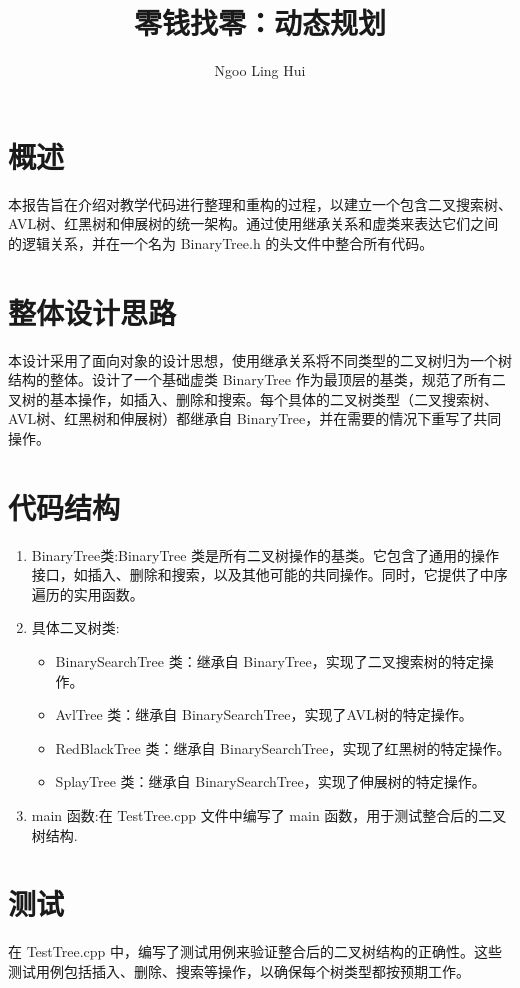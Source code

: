 \documentclass{ctexart}
\title{零钱找零：动态规划}
\author{Ngoo Ling Hui}
\begin{document}
\maketitle

\section{概述}
本报告旨在介绍对教学代码进行整理和重构的过程，以建立一个包含二叉搜索树、AVL树、红黑树和伸展树的统一架构。通过使用继承关系和虚类来表达它们之间的逻辑关系，并在一个名为 BinaryTree.h 的头文件中整合所有代码。

\section{整体设计思路}
本设计采用了面向对象的设计思想，使用继承关系将不同类型的二叉树归为一个树结构的整体。设计了一个基础虚类 BinaryTree 作为最顶层的基类，规范了所有二叉树的基本操作，如插入、删除和搜索。每个具体的二叉树类型（二叉搜索树、AVL树、红黑树和伸展树）都继承自 BinaryTree，并在需要的情况下重写了共同操作。

\section{代码结构}
\begin{enumerate}
    \item BinaryTree类:BinaryTree 类是所有二叉树操作的基类。它包含了通用的操作接口，如插入、删除和搜索，以及其他可能的共同操作。同时，它提供了中序遍历的实用函数。
    \item 具体二叉树类:
    \begin{itemize}
        \item BinarySearchTree 类：继承自 BinaryTree，实现了二叉搜索树的特定操作。
        \item AvlTree 类：继承自 BinarySearchTree，实现了AVL树的特定操作。
        \item RedBlackTree 类：继承自 BinarySearchTree，实现了红黑树的特定操作。
        \item SplayTree 类：继承自 BinarySearchTree，实现了伸展树的特定操作。
    \end{itemize}
    \item main 函数:在 TestTree.cpp 文件中编写了 main 函数，用于测试整合后的二叉树结构.
\end{enumerate}

\section{测试}
在 TestTree.cpp 中，编写了测试用例来验证整合后的二叉树结构的正确性。这些测试用例包括插入、删除、搜索等操作，以确保每个树类型都按预期工作。
\end{document}
